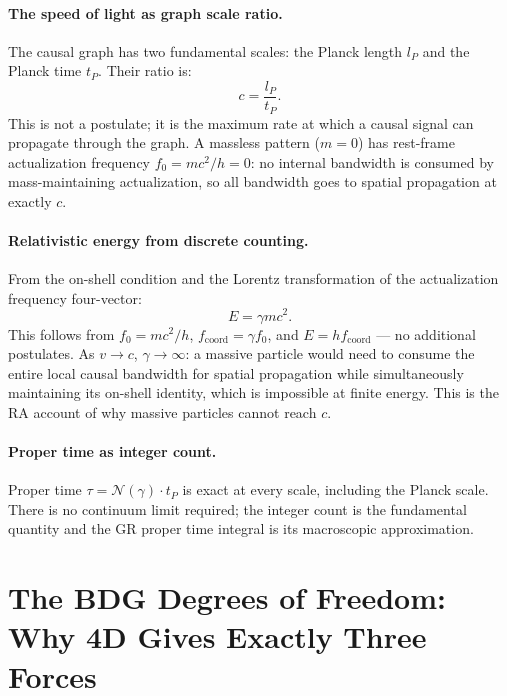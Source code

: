 \documentclass[11pt,a4paper]{article}
\begin{document}
\paragraph{The speed of light as graph scale ratio.}
The causal graph has two fundamental scales: the Planck length $l_P$ and the
Planck time $t_P$. Their ratio is:
\begin{equation}
  c = \frac{l_P}{t_P}.
  \label{eq:c_native}
\end{equation}
This is not a postulate; it is the maximum rate at which a causal signal can
propagate through the graph. A massless pattern ($m = 0$) has rest-frame
actualization frequency $f_0 = mc^2/h = 0$: no internal bandwidth is consumed
by mass-maintaining actualization, so all bandwidth goes to spatial propagation
at exactly $c$.

\paragraph{Relativistic energy from discrete counting.}
From the on-shell condition and the Lorentz transformation of the actualization
frequency four-vector:
\begin{equation}
  E = \gamma mc^2.
  \label{eq:rel_energy}
\end{equation}
This follows from $f_0 = mc^2/h$, $f_{\mathrm{coord}} = \gamma f_0$, and
$E = hf_{\mathrm{coord}}$ --- no additional postulates. As $v \to c$,
$\gamma \to \infty$: a massive particle would need to consume the entire local
causal bandwidth for spatial propagation while simultaneously maintaining its
on-shell identity, which is impossible at finite energy. This is the RA
account of why massive particles cannot reach $c$.

\paragraph{Proper time as integer count.}
Proper time $\tau = \mathcal{N}(\gamma) \cdot t_P$ is exact at every scale,
including the Planck scale. There is no continuum limit required; the integer
count is the fundamental quantity and the GR proper time integral is its
macroscopic approximation.

\section{The BDG Degrees of Freedom: Why 4D Gives Exactly Three Forces}
\label{sec:four_dof}
\end{document}
